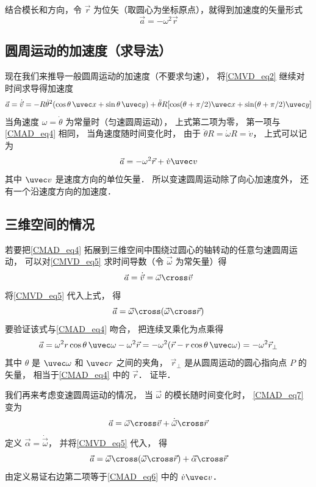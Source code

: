 结合模长和方向，令 $\vec r$ 为位矢（取圆心为坐标原点），就得到加速度的矢量形式
\begin{equation}\label{CMAD_eq4}
\vec a =  - \omega ^2 \vec r
\end{equation}

\subsection{圆周运动的加速度（求导法）}
现在我们来推导一般圆周运动的加速度（不要求匀速），  将\autoref{CMVD_eq2} 继续对时间求导得加速度
\begin{equation}
\vec a = \dot {\vec v} =  - R \dot\theta^2(\cos \theta\, \uvec x + \sin \theta\, \uvec y) + \ddot\theta R [\cos(\theta + \pi/2) \uvec x + \sin(\theta + \pi/2)\uvec y]
\end{equation}
当角速度 $\omega = \dot\theta$ 为常量时（匀速圆周运动）， 上式第二项为零， 第一项与\autoref{CMAD_eq4} 相同， 当角速度随时间变化时， 由于 $\ddot\theta R = \dot\omega R = \dot v$， 上式可以记为
\begin{equation}\label{CMAD_eq6}
\vec a = - \omega ^2 \vec r + \dot v \uvec v
\end{equation}
其中 $\uvec v$ 是速度方向的单位矢量． 所以变速圆周运动除了向心加速度外， 还有一个沿速度方向的加速度．

\subsection{三维空间的情况}
若要把\autoref{CMAD_eq4} 拓展到三维空间中围绕过圆心的轴转动的任意匀速圆周运动， 可以对\autoref{CMVD_eq5} 求时间导数（令 $\vec\omega$ 为常矢量）得
\begin{equation}\label{CMAD_eq7}
\vec a = \dot{\vec v} = \vec\omega \cross \vec v
\end{equation}
将\autoref{CMVD_eq5} 代入上式， 得
\begin{equation}\label{CMAD_eq9}
\vec a =  \vec\omega \cross (\vec\omega \cross \vec r)
\end{equation}
要验证该式与\autoref{CMAD_eq4} 吻合， 把连续叉乘化为点乘得
\begin{equation}
\vec a = \omega^2 r \cos\theta\, \uvec \omega - \omega^2 \vec r = -\omega^2 (\vec r - r\cos\theta\, \uvec\omega) = -\omega^2 \vec r_\bot
\end{equation}
其中 $\theta$ 是 $\uvec\omega$ 和 $\uvec r$ 之间的夹角， $\vec r_\bot$ 是从圆周运动的圆心指向点 $P$ 的矢量， 相当于\autoref{CMAD_eq4} 中的 $\vec r$． 证毕．

我们再来考虑变速圆周运动的情况， 当 $\vec\omega$ 的模长随时间变化时， \autoref{CMAD_eq7} 变为
\begin{equation}
\vec a = \vec\omega \cross \vec v + \dot{\vec\omega} \cross \vec r 
\end{equation}
定义 $\vec\alpha = \dot{\vec\omega}$， 并将\autoref{CMVD_eq5} 代入， 得
\begin{equation}
\vec a =  \vec\omega \cross (\vec\omega \cross \vec r) + \vec\alpha\cross\vec r
\end{equation}
由定义易证右边第二项等于\autoref{CMAD_eq6} 中的 $\dot v\uvec v$．




